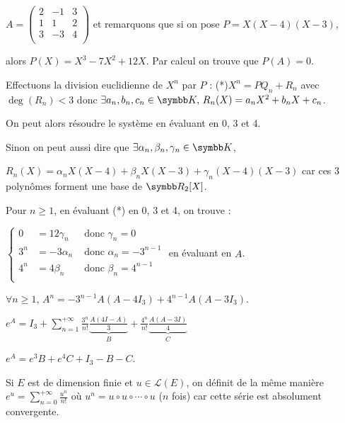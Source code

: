 \begin{exemple}
    $A = \begin{pmatrix}
        2 & -1 & 3\\
        1 & 1 & 2 \\
        3 & -3 & 4 \\
    \end{pmatrix}$ et remarquons que si on pose $P = X(X - 4)(X - 3)$, 
    
    alors $P(X) = X^3 - 7 X^2 + 12X$. Par calcul on trouve que $P(A) = 0$.

    Effectuons la division euclidienne de $X^n$ par $P$ : (*)$X^n = P Q_n + R_n$ avec 
    $\deg(R_n) < 3$ donc $\exists a_n, b_n, c_n \in \K, \, R_n(X) = a_n X^2 + b_n X + c_n$.

    On peut alors résoudre le système en évaluant en 0, 3 et 4. 

    Sinon on peut aussi dire que $\exists \alpha_n, \beta_n, \gamma_n \in \K$,  
    
    $R_n(X) = \alpha_n X(X - 4) + \beta_n X(X - 3) + \gamma_n (X - 4)(X - 3)$
    car ces 3 polynômes forment une base de $\R_2[X]$.

    Pour $n \geqslant 1$, en évaluant (*) en 0, 3 et 4, on trouve : 

    $\left\{ \begin{array}{rcl}
        0 & = 12 \gamma_n & \text{ donc } \gamma_n = 0\\
        3^n & = -3 \alpha_n & \text{ donc } \alpha_n = - 3^{n - 1} \\
        4^n & = 4 \beta_n & \text{ donc } \beta_n = 4^{n - 1}\\
    \end{array} \right.
    $ en évaluant en $A$. 

    $\forall n \geqslant 1, \, A^n = -3^{n - 1} A(A - 4 I_3) + 4^{n - 1} A(A - 3 I_3)$.

    $\displaystyle e^A = I_3 + \sum_{n = 1}^{+\infty} \frac{3^n}{n!} \underbrace{\frac{A(4I - A)}{3}}_B + \frac{4^n}{n!} \underbrace{\frac{A(A - 3 I)}{4}}_C$

    $e^A = e^3 B + e^4 C + I_3 - B - C$.
\end{exemple}

\begin{remarque}
    Si $E$ est de dimension finie et $u \in \mathscr{L }(E)$, on définit de la même manière 
    $\displaystyle e^u = \sum_{n = 0}^{+\infty} \frac{u^n}{n!}$ où $u^n = u \circ u \circ \cdots \circ u$ ($n$ fois)
    car cette série est absolument convergente. 
\end{remarque}

